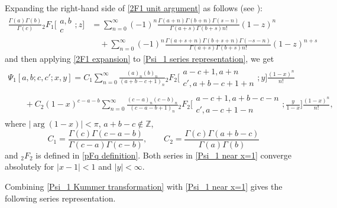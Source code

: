 \documentclass[pdftex]{sigma}
\numberwithin{equation}{section}
\newcommand{\ZZ}{\ensuremath{\mathbb{Z}}}
\begin{document}
Expanding the right-hand side of \eqref{2F1 unit argument} as follows (see \cite[equation~(1.1)]{Buhring-1992}):
\begin{align}
		\frac{\Gamma(a)\Gamma(b)}{\Gamma(c)}{}_2F_1\biggl[\begin{matrix}
			a,b \\
			c
		\end{matrix};z\biggr]&{}= \sum_{n=0}^{\infty}(-1)^n\frac{\Gamma(a+n)\Gamma(b+n)\Gamma(s-n)}{\Gamma(a+s)\Gamma(b+s)n!}(1-z)^n \nonumber\\
		&\quad{} +\sum_{n=0}^{\infty}(-1)^n\frac{\Gamma(a+s+n)\Gamma(b+s+n)\Gamma(-s-n)}{\Gamma(a+s)\Gamma(b+s)n!}(1-z)^{n+s}\label{2F1 expansion}
\end{align}
and then applying \eqref{2F1 expansion} to \eqref{Psi_1 series representation}, we get
\begin{gather}
		\Psi_1[a,b;c,c';x,y] =C_1\sum_{n=0}^{\infty}\frac{(a)_n(b)_n}{(a+b-c+1)_n}
		{}_2F_2\biggl[\begin{matrix}
			a-c+1,a+n \\
			c',a+b-c+1+n
		\end{matrix};y\biggr]\frac{ (1-x )^n}{n!}\label{Psi_1 near x=1}\\
		\qquad{} +C_2 (1-x )^{c-a-b}\sum_{n=0}^{\infty}\frac{ (c-a )_n (c-b )_n}{ (c-a-b+1 )_n}
		{}_2F_2\biggl[\begin{matrix}
			a-c+1,a+b-c-n \\
			c',a-c+1-n
		\end{matrix};\frac{y}{1-x}\biggr]\frac{ (1-x )^n}{n!},\nonumber
\end{gather}
where $|{\arg}(1-x)|<\pi$, $a+b-c\notin\ZZ$,
\[C_1=\frac{\Gamma(c)\Gamma(c-a-b)}{\Gamma(c-a)\Gamma(c-b)},\qquad C_2=\frac{\Gamma(c)\Gamma(a+b-c)}{\Gamma(a)\Gamma(b)}
\]
and $_{2}F_{2}$ is defined in \eqref{pFq definition}.
Both series in \eqref{Psi_1 near x=1} converge absolutely for $|x-1|<1$ and $|y|<\infty$.

Combining \eqref{Psi_1 Kummer transformation} with \eqref{Psi_1 near x=1} gives the following series representation.
\end{document}
